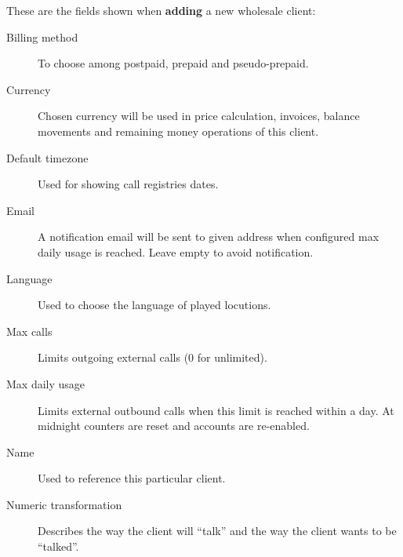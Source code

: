 \documentclass[letterpaper,10pt,english]{sphinxmanual}
\begin{document}
These are the fields shown when \textbf{adding} a new wholesale client:
\begin{description}
\item[{Billing method}] \leavevmode{}\label{administration_portal/brand/clients/wholesale:term-billing-method}
To choose among postpaid, prepaid and pseudo-prepaid.

\item[{Currency}] \leavevmode{}\label{administration_portal/brand/clients/wholesale:term-currency}
Chosen currency will be used in price calculation, invoices, balance movements and
remaining money operations of this client.

\item[{Default timezone}] \leavevmode{}\label{administration_portal/brand/clients/wholesale:term-default-timezone}
Used for showing call registries dates.

\item[{Email}] \leavevmode{}\label{administration_portal/brand/clients/wholesale:term-email}
A notification email will be sent to given address when configured max daily usage is reached. Leave empty to
avoid notification.

\item[{Language}] \leavevmode{}\label{administration_portal/brand/clients/wholesale:term-language}
Used to choose the language of played locutions.

\item[{Max calls}] \leavevmode{}\label{administration_portal/brand/clients/wholesale:term-max-calls}
Limits outgoing external calls (0 for unlimited).

\item[{Max daily usage}] \leavevmode{}\label{administration_portal/brand/clients/wholesale:term-max-daily-usage}
Limits external outbound calls when this limit is reached within a day. At midnight counters are reset and
accounts are re-enabled.

\item[{Name}] \leavevmode{}\label{administration_portal/brand/clients/wholesale:term-name}
Used to reference this particular client.

\item[{Numeric transformation}] \leavevmode{}\label{administration_portal/brand/clients/wholesale:term-numeric-transformation}
Describes the way the client will ``talk'' and the way the client wants to be ``talked''.

\end{description}
\end{document}
